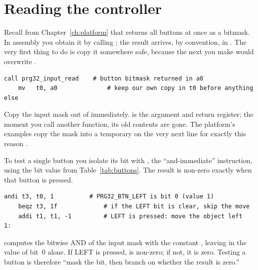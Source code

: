 \section{Reading the controller}

Recall from Chapter~\ref{ch:platform} that \prg returns all buttons at once as a
bitmask. In assembly you obtain it by calling ; the
result arrives, by convention, in . The very first thing to do is copy it
somewhere safe, because the next  you make would overwrite .

\begin{lstlisting}[style=asm,caption={Read the input bitmask and keep it. The copy to a temporary is essential, because later calls reuse \reg{a0}.}]
    call prg32_input_read    # button bitmask returned in a0
    mv   t0, a0              # keep our own copy in t0 before anything else
\end{lstlisting}

\begin{prgwarn}
Copy the input mask out of  immediately.  is the argument and
return register; the moment you call another function, its old contents are gone.
The platform's examples copy the mask into a temporary on the very next line for
exactly this reason \citep{prg32tutorialascii}.
\end{prgwarn}

To test a single button you isolate its bit with , the
``and-immediate'' instruction, using the bit value from
Table~\ref{tab:buttons}. The result is non-zero exactly when that button is
pressed.

\begin{lstlisting}[style=asm,caption={Testing one button. \code{andi} keeps only the chosen bit; \code{beqz} skips the body when that bit is clear.}]
    andi t3, t0, 1          # PRG32_BTN_LEFT is bit 0 (value 1)
    beqz t3, 1f             # if the LEFT bit is clear, skip the move
    addi t1, t1, -1         # LEFT is pressed: move the object left
1:
\end{lstlisting}

\begin{prgconcept}
 computes the bitwise AND of the input mask with the
constant , leaving in  the value of bit~0 alone. If LEFT is
pressed,  is non-zero; if not, it is zero. Testing a button is therefore
``mask the bit, then branch on whether the result is zero.''
\end{prgconcept}

